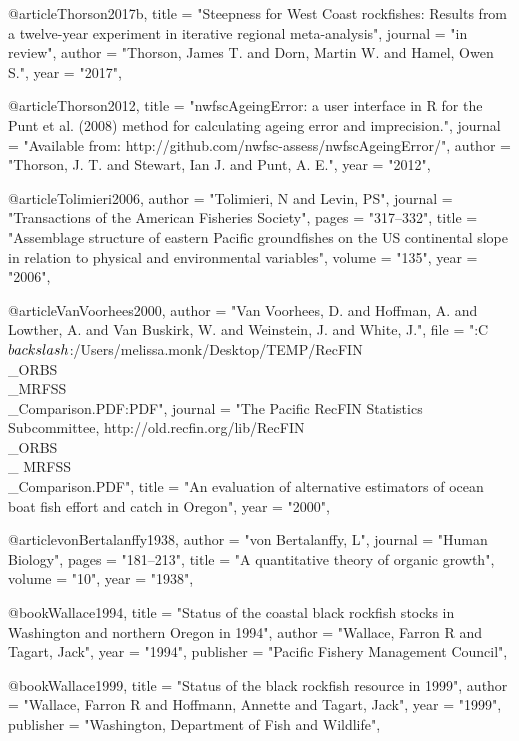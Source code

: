 @article{Thorson2017b,
    title = "{Steepness for West Coast rockfishes:  Results from a twelve-year experiment in iterative regional meta-analysis}",
    journal = "{in review}",
    author = "{Thorson, James T. and Dorn, Martin W. and Hamel, Owen S.}",
    year = "{2017}",
}

@article{Thorson2012,
    title = "{{nwfscAgeingError}: a user interface in {R} for the {Punt} et al. (2008) method for calculating ageing error and imprecision.}",
    journal = "{Available from: http://github.com/nwfsc-assess/nwfscAgeingError/}",
    author = "{Thorson, J. T. and Stewart, Ian J. and Punt, A. E.}",
    year = "{2012}",
}

@article{Tolimieri2006,
    author = "{Tolimieri, N and Levin, PS}",
    journal = "{Transactions of the American Fisheries Society}",
    pages = "{317--332}",
    title = "{{Assemblage structure of eastern Pacific groundfishes on the US continental slope in relation to physical and environmental variables}}",
    volume = "{135}",
    year = "{2006}",
}

@article{VanVoorhees2000,
    author = "{{Van Voorhees}, D. and Hoffman, A. and Lowther, A. and {Van Buskirk}, W. and Weinstein, J. and White, J.}",
    file = "{:C$\\backslash$:/Users/melissa.monk/Desktop/TEMP/RecFIN\\_ORBS\\_MRFSS\\_Comparison.PDF:PDF}",
    journal = "{The Pacific RecFIN Statistics Subcommittee, http://old.recfin.org/lib/RecFIN\\_ORBS\\_ MRFSS\\_Comparison.PDF}",
    title = "{{An evaluation of alternative estimators of ocean boat fish effort and catch in Oregon}}",
    year = "{2000}",
}

@article{vonBertalanffy1938,
    author = "{von Bertalanffy, L}",
    journal = "{Human Biology}",
    pages = "{181--213}",
    title = "{{A quantitative theory of organic growth}}",
    volume = "{10}",
    year = "{1938}",
}

@book{Wallace1994,
    title = "{Status of the coastal black rockfish stocks in Washington and northern Oregon in 1994}",
    author = "{Wallace, Farron R and Tagart, Jack}",
    year = "{1994}",
    publisher = "{Pacific Fishery Management Council}",
}

@book{Wallace1999,
    title = "{Status of the black rockfish resource in 1999}",
    author = "{Wallace, Farron R and Hoffmann, Annette and Tagart, Jack}",
    year = "{1999}",
    publisher = "{Washington, Department of Fish and Wildlife}",
}

